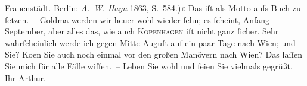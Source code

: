 \begin{ledgroupsized}[t]{13cm}
{{{                        Frauenstädt. Berlin: \emph{A. W. Hayn}{ }1863, S. 584.)}}}\label{K_L00467_1h}« Das iſt als Motto aufs Buch zu
               ſetzen. –\pend
           \pstart
           Goldma{\geminationn} werden wir heuer wohl wieder ſehn; es ſcheint, Anfang September,
               aber alles das, wie auch \textsc{Kopenhagen} iſt nicht ganz ſicher. Sehr wahrſcheinlich werde ich gegen Mitte
                  Auguſt auf ein paar Tage nach Wien; und
               Sie? Ko{\geminationm}en Sie auch noch einmal vor den großen Manövern
               nach Wien? Das {\pb}laſſen
               Sie mich für alle Fälle wiſſen. –\pend
           \pstart
           Leben Sie wohl und ſeien Sie vielmals gegrüßt.\pend
           \pstart Ihr \spacefill\mbox{Arthur.}\pend{}
         
         \endnumbering{}\end{ledgroupsized}  \newcommand{\dateiname}{L00467}\newcommand{\titel}{Arthur Schnitzler an Hugo von Hofmannsthal, 28. 7. 1895}\newcommand{\editorInnen}{Martin Anton Müller und Gerd-Hermann Susen}
      